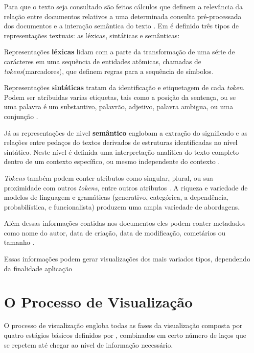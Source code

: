Para que o texto seja consultado são feitos cálculos que definem a relevância da relação entre documentos relativos a uma determinada consulta pré-processada dos documentos e a interação semântica do texto \cite{ward2015interactive}. Em \cite{ward2015interactive} é definido três tipos de representações textuais: as léxicas, sintáticas e semânticas: 

Representações \textbf{léxicas} lidam com a parte da transformação de uma série de carácteres em uma sequência de entidades atômicas, chamadas de \emph{tokens}(marcadores), que definem regras para a sequência de símbolos. 

Representações \textbf{sintáticas} tratam da identificação e etiquetagem de cada \emph{token}. Podem ser atribuidas varias etiquetas, tais como a posição da sentença, ou se uma palavra é um substantivo, palavrão, adjetivo, palavra ambigua, ou uma conjunção \cite{ward2015interactive}. 

Já as representações de nivel \textbf{semântico} englobam a extração do significado e as relações entre pedaços do textos derivados de estruturas identificadas no nível sintático. Neste nível é definida uma interpretação analítica do texto completo dentro de um contexto específico, ou mesmo independente do contexto \cite{ward2015interactive}.

\emph{Tokens} também podem conter atributos como singular, plural, ou sua proximidade com outros \textit{tokens}, entre outros atributos \cite{ward2015interactive}.
 A riqueza e variedade de modelos de linguagem e gramáticas (generativo, categórica, a dependência, probabilística, e funcionalista) produzem uma ampla variedade de abordagens.


Além dessas informações contidas nos documentos eles podem conter metadados como nome do autor, data de criação, data de modificação, cometários ou tamanho \cite{ward2015interactive}.

Essas informações podem gerar visualizações dos mais variados tipos, dependendo da finalidade aplicação



\section{O Processo de Visualização}

O processo de visualização engloba todas as fases da visualização composta por quatro estágios básicos definidos por \cite{ware2012information}, combinados em certo número de laços que se repetem até chegar ao nível de informação necessário.

